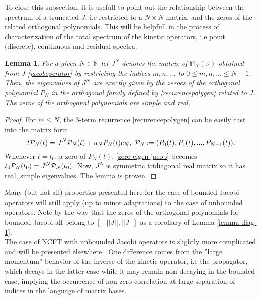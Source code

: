 \documentclass[a4paper,11pt,twoside]{article}
\numberwithin{equation}{section}
\newtheorem{lemma}[Theorem]{Lemma}
\theoremstyle{nonumberplain}
\newtheorem{proof}{Proof}
\begin{document}
To close this subsection, it is usefull to point out the relationship between the spectrum of a truncated $J$, i.e restricted to a $N\times N$ matrix, and the zeros of the related orthogonal polynomials. This will be helpfull in the process of characterization of the total spectrum of the kinetic operators, i.e point (discrete), continuous and residual spectra.
\begin{lemma}\label{lemma-spectral}
For a given $N\in\mathbb{N}$ let $J^N$ denotes the matrix of $\mathbb{M}_N(\mathbb{R})$ obtained from $J$ \eqref{jacoboperator} by restricting the indices $m,n,...$ to $0\le m,n,...\le N-1$. Then, the eigenvalues of $J^N$ are exactly given by the zeroes of the orthogonal polynomial $P_N$ in the orthogonal family defined by \eqref{recurencepolygen} related to $J$. The zeros of the orthogonal polynomials are simple and real.
\end{lemma}\label{lemma-diag-1}
\begin{proof}
For $m\le N$, the 3-term recurrence \eqref{recurencepolygen} can be easily cast into the matrix form 
\begin{equation}
t{\cal{P}}_N(t)=J^N{\cal{P}}_N(t)+a_NP_N(t)e_N,\ {\cal{P}}_N:=(P_0(t),P_1(t),...,P_{N-1}(t))\label{zero-eigen-jacob}.
\end{equation}
Whenever $t=t_0$, a zero of $P_N(t)$, \eqref{zero-eigen-jacob} becomes $t_0{\cal{P}}_N(t_0)=J^N{\cal{P}}_N(t_0)$. Now, $J^N$ is symmetric tridiagonal real matrix so it has real, simple eigenvalues. The lemma is proven.
\end{proof}
Many (but not all) properties presented here for the case of bounded Jacobi operators will still apply (up to minor adaptations) to the case of unbounded operators. Note by the way that the zeros of the orthogonal polynomials for bounded Jacobi all belong to $[-||J||,||J||]$ as a corollary of Lemma \ref{lemma-diag-1}.\\
The case of NCFT with unbounded Jacobi operators is slightly more complicated and will be presented elsewhere \cite{unboud-jac}. One difference comes from the ''large momentum'' behavior of the inverse of the kinetic operator, i.e the propagator, which decays in the latter case while it may remain non decaying in the bounded case, implying the occurrence of non zero correlation at large separation of indices in the language of matrix bases.\\
\end{document}
